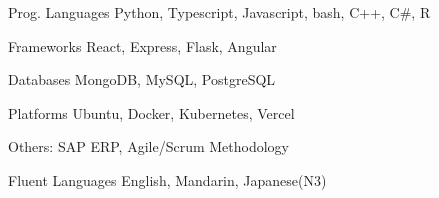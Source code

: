 

\begin{cvskills}

  \cvskill
  {Prog. Languages} %
  {} %
  {Python, Typescript, Javascript, bash, C++, C\#, R} %

  \cvskill
  {Frameworks} %
  {} %
  {React, Express, Flask, Angular} %

  \cvskill
  {Databases} %
  {} %
  {MongoDB, MySQL, PostgreSQL} %

  \cvskill
  {Platforms} %
  {} %
  {Ubuntu, Docker, Kubernetes, Vercel} %


  \cvskill
  {Others:} %
  {} %
  {SAP ERP, Agile/Scrum Methodology} %

  \cvskill
  {Fluent Languages} %
  {} %
  {English, Mandarin, Japanese(N3)} %

\end{cvskills}
